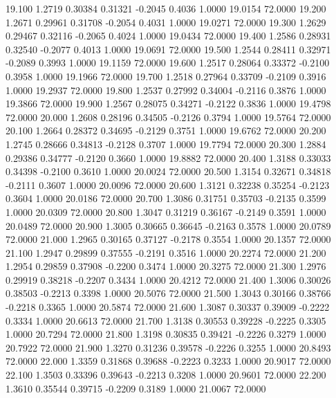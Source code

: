   19.100   1.2719   0.30384   0.31321  -0.2045   0.4036   1.0000  19.0154  72.0000
  19.200   1.2671   0.29961   0.31708  -0.2054   0.4031   1.0000  19.0271  72.0000
  19.300   1.2629   0.29467   0.32116  -0.2065   0.4024   1.0000  19.0434  72.0000
  19.400   1.2586   0.28931   0.32540  -0.2077   0.4013   1.0000  19.0691  72.0000
  19.500   1.2544   0.28411   0.32971  -0.2089   0.3993   1.0000  19.1159  72.0000
  19.600   1.2517   0.28064   0.33372  -0.2100   0.3958   1.0000  19.1966  72.0000
  19.700   1.2518   0.27964   0.33709  -0.2109   0.3916   1.0000  19.2937  72.0000
  19.800   1.2537   0.27992   0.34004  -0.2116   0.3876   1.0000  19.3866  72.0000
  19.900   1.2567   0.28075   0.34271  -0.2122   0.3836   1.0000  19.4798  72.0000
  20.000   1.2608   0.28196   0.34505  -0.2126   0.3794   1.0000  19.5764  72.0000
  20.100   1.2664   0.28372   0.34695  -0.2129   0.3751   1.0000  19.6762  72.0000
  20.200   1.2745   0.28666   0.34813  -0.2128   0.3707   1.0000  19.7794  72.0000
  20.300   1.2884   0.29386   0.34777  -0.2120   0.3660   1.0000  19.8882  72.0000
  20.400   1.3188   0.33033   0.34398  -0.2100   0.3610   1.0000  20.0024  72.0000
  20.500   1.3154   0.32671   0.34818  -0.2111   0.3607   1.0000  20.0096  72.0000
  20.600   1.3121   0.32238   0.35254  -0.2123   0.3604   1.0000  20.0186  72.0000
  20.700   1.3086   0.31751   0.35703  -0.2135   0.3599   1.0000  20.0309  72.0000
  20.800   1.3047   0.31219   0.36167  -0.2149   0.3591   1.0000  20.0489  72.0000
  20.900   1.3005   0.30665   0.36645  -0.2163   0.3578   1.0000  20.0789  72.0000
  21.000   1.2965   0.30165   0.37127  -0.2178   0.3554   1.0000  20.1357  72.0000
  21.100   1.2947   0.29899   0.37555  -0.2191   0.3516   1.0000  20.2274  72.0000
  21.200   1.2954   0.29859   0.37908  -0.2200   0.3474   1.0000  20.3275  72.0000
  21.300   1.2976   0.29919   0.38218  -0.2207   0.3434   1.0000  20.4212  72.0000
  21.400   1.3006   0.30026   0.38503  -0.2213   0.3398   1.0000  20.5076  72.0000
  21.500   1.3043   0.30166   0.38766  -0.2218   0.3365   1.0000  20.5874  72.0000
  21.600   1.3087   0.30337   0.39009  -0.2222   0.3334   1.0000  20.6613  72.0000
  21.700   1.3138   0.30553   0.39228  -0.2225   0.3305   1.0000  20.7294  72.0000
  21.800   1.3198   0.30835   0.39421  -0.2226   0.3279   1.0000  20.7922  72.0000
  21.900   1.3270   0.31236   0.39578  -0.2226   0.3255   1.0000  20.8493  72.0000
  22.000   1.3359   0.31868   0.39688  -0.2223   0.3233   1.0000  20.9017  72.0000
  22.100   1.3503   0.33396   0.39643  -0.2213   0.3208   1.0000  20.9601  72.0000
  22.200   1.3610   0.35544   0.39715  -0.2209   0.3189   1.0000  21.0067  72.0000
